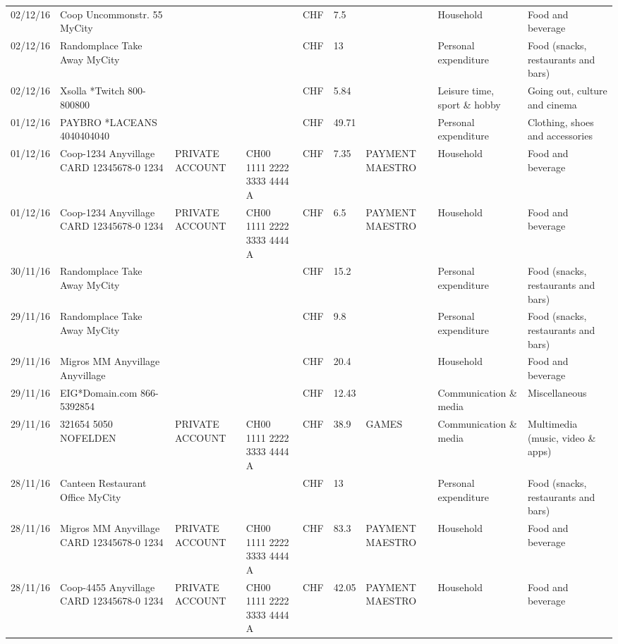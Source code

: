 \begin{landscape}
\begin{center}
\begin{longtable}{lllllllll}
		02/12/16 & Coop Uncommonstr. 55   MyCity &       &       & CHF   & 7.5   &       & Household & Food and beverage \\
		02/12/16 & Randomplace Take Away     MyCity &       &       & CHF   & 13    &       & Personal expenditure & Food (snacks, restaurants and bars) \\
		02/12/16 & Xsolla *Twitch           800-800800 &       &       & CHF   & 5.84  &       & Leisure time, sport \& hobby & Going out, culture and cinema \\
		01/12/16 & PAYBRO *LACEANS      4040404040 &       &       & CHF   & 49.71 &       & Personal expenditure & Clothing, shoes and accessories \\
		01/12/16 & Coop-1234 Anyvillage CARD 12345678-0 1234 & PRIVATE ACCOUNT & CH00 1111 2222 3333 4444 A & CHF   & 7.35  & PAYMENT MAESTRO & Household & Food and beverage \\
		01/12/16 & Coop-1234 Anyvillage CARD 12345678-0 1234 & PRIVATE ACCOUNT & CH00 1111 2222 3333 4444 A & CHF   & 6.5   & PAYMENT MAESTRO & Household & Food and beverage \\
		30/11/16 & Randomplace Take Away     MyCity &       &       & CHF   & 15.2  &       & Personal expenditure & Food (snacks, restaurants and bars) \\
		29/11/16 & Randomplace Take Away     MyCity &       &       & CHF   & 9.8   &       & Personal expenditure & Food (snacks, restaurants and bars) \\
		29/11/16 & Migros MM Anyvillage    Anyvillage &       &       & CHF   & 20.4  &       & Household & Food and beverage \\
		29/11/16 & EIG*Domain.com           866-5392854 &       &       & CHF   & 12.43 &       & Communication \& media & Miscellaneous \\
		29/11/16 & 321654 5050 NOFELDEN & PRIVATE ACCOUNT & CH00 1111 2222 3333 4444 A & CHF   & 38.9  & GAMES & Communication \& media & Multimedia (music, video \& apps) \\
		28/11/16 & Canteen Restaurant Office      MyCity &       &       & CHF   & 13    &       & Personal expenditure & Food (snacks, restaurants and bars) \\
		28/11/16 & Migros MM Anyvillage CARD 12345678-0 1234 & PRIVATE ACCOUNT & CH00 1111 2222 3333 4444 A & CHF   & 83.3  & PAYMENT MAESTRO & Household & Food and beverage \\
		28/11/16 & Coop-4455 Anyvillage CARD 12345678-0 1234 & PRIVATE ACCOUNT & CH00 1111 2222 3333 4444 A & CHF   & 42.05 & PAYMENT MAESTRO & Household & Food and beverage \\

\end{longtable}
\end{center}
\end{landscape}
